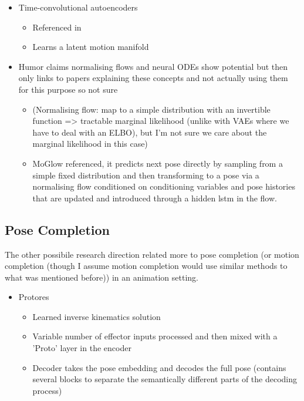 \begin{itemize}
\begin{itemize}
    \end{itemize}
    \item Time-convolutional autoencoders
    \begin{itemize}
        \item Referenced in \cite{MotionVAE}
        \item Learns a latent motion manifold
    \end{itemize}
    \item Humor claims normalising flows and neural ODEs show potential but then only links to papers explaining these concepts and not actually using them for this purpose so not sure
    \begin{itemize}
        \item (Normalising flow: map to a simple distribution with an invertible function => tractable marginal likelihood (unlike with VAEs where we have to deal with an ELBO), but I'm not sure we care about the marginal likelihood in this case)
        \item \cite{MoGlow} MoGlow referenced, it predicts next pose directly by sampling from a simple fixed distribution and then transforming to a pose via a normalising flow conditioned on conditioning variables and pose histories that are updated and introduced through a hidden lstm in the flow.
    \end{itemize}
\end{itemize}


\subsection{Pose Completion}
The other possibile research direction related more to pose completion (or motion completion (though I assume motion completion would use similar methods to what was mentioned before)) in an animation setting.

\begin{itemize}
    \item Protores \cite{protores}
    \begin{itemize}
        \item Learned inverse kinematics solution
        \item Variable number of effector inputs processed and then mixed with a 'Proto' layer in the encoder
        \item Decoder takes the pose embedding and decodes the full pose (contains several blocks to separate the semantically different parts of the decoding process)
    \end{itemize}
\end{itemize}